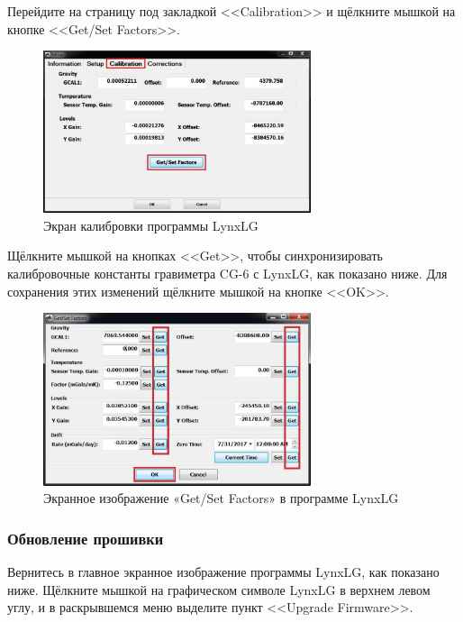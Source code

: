 Перейдите на страницу под закладкой <<Calibration>> и щёлкните мышкой на кнопке
<<Get/Set Factors>>.

\begin{figure}[H]
  \centering
  \includegraphics[width=0.7\textwidth]{figures/the_lynxlg_software_calibration_screen}
  \caption{Экран калибровки программы LynxLG}
  \label{fig:the_lynxlg_software_calibration_screen}
\end{figure}

Щёлкните мышкой на кнопках <<Get>>, чтобы синхронизировать калибровочные
константы гравиметра CG-6 с LynxLG, как показано ниже. Для сохранения этих
изменений щёлкните мышкой на кнопке <<OK>>.

\begin{figure}[H]
  \centering
  \includegraphics[width=0.7\textwidth]{figures/the_lynxlg_software_get_set_factors_screen}
  \caption{Экранное изображение «Get/Set Factors» в программе LynxLG}
  \label{fig:the_lynxlg_software_get_set_factors_screen}
\end{figure}

\subsubsection{Обновление прошивки}
\label{subsubsec:update_firmware}

Вернитесь в главное экранное изображение программы LynxLG, как показано ниже.
Щёлкните мышкой на графическом символе LynxLG в верхнем левом углу, и в
раскрывшемся меню выделите пункт <<Upgrade Firmware>>.

